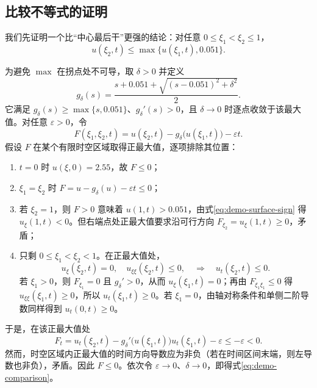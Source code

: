 \documentclass[UTF8,a4paper,fontset=fandol]{ctexart}
\numberwithin{equation}{section}
\newcommand{\ambmax}{0.051}
\begin{document}
\subsection{比较不等式的证明}

我们先证明一个比“中心最后干”更强的结论：对任意 $0\le\xi_1<\xi_2\le1$，
\begin{equation}
  u(\xi_2,t)\le \max\{u(\xi_1,t),\ambmax\}.
  \label{eq:demo-comparison}
\end{equation}

为避免 $\max$ 在拐点处不可导，取 $\delta>0$ 并定义
\begin{equation}
  g_\delta(s)=\frac{s+\ambmax+\sqrt{(s-\ambmax)^2+\delta^2}}{2}.
  \label{eq:demo-smooth-max}
\end{equation}
它满足 $g_\delta(s)\ge\max\{s,\ambmax\}$、$g_\delta'(s)>0$，且 $\delta\to0$ 时逐点收敛于该最大值。对任意 $\varepsilon>0$，令
\begin{equation}
  F(\xi_1,\xi_2,t)=u(\xi_2,t)-g_\delta\bigl(u(\xi_1,t)\bigr)-\varepsilon t.
  \label{eq:demo-F}
\end{equation}
假设 $F$ 在某个有限时空区域取得正最大值，逐项排除其位置：

\begin{enumerate}
  \item $t=0$ 时 $u(\xi,0)=2.55$，故 $F\le0$；
  \item $\xi_1=\xi_2$ 时 $F=u-g_\delta(u)-\varepsilon t\le0$；
  \item 若 $\xi_2=1$，则 $F>0$ 意味着 $u(1,t)>\ambmax$，由式\eqref{eq:demo-surface-sign} 得 $u_\xi(1,t)<0$。但右端点处正最大值要求沿可行方向 $F_{\xi_2}=u_\xi(1,t)\ge0$，矛盾；
  \item 只剩 $0\le\xi_1<\xi_2<1$。在正最大值处，
  \begin{equation*}
    u_\xi(\xi_2,t)=0,\quad u_{\xi\xi}(\xi_2,t)\le0,
    \quad\Longrightarrow\quad u_t(\xi_2,t)\le0.
  \end{equation*}
  若 $\xi_1>0$，则 $F_{\xi_1}=0$ 且 $g_\delta'>0$，从而 $u_\xi(\xi_1,t)=0$；再由 $F_{\xi_1\xi_1}\le0$ 得 $u_{\xi\xi}(\xi_1,t)\ge0$，所以 $u_t(\xi_1,t)\ge0$。若 $\xi_1=0$，由轴对称条件和单侧二阶导数同样得到 $u_t(0,t)\ge0$。
\end{enumerate}

于是，在该正最大值处
\begin{equation}
  F_t=u_t(\xi_2,t)-g_\delta'\bigl(u(\xi_1,t)\bigr)u_t(\xi_1,t)-\varepsilon
  \le-\varepsilon<0.
  \label{eq:demo-Ft}
\end{equation}
然而，时空区域内正最大值的时间方向导数应为非负（若在时间区间末端，则左导数也非负），矛盾。因此 $F\le0$。依次令 $\varepsilon\to0$、$\delta\to0$，即得式\eqref{eq:demo-comparison}。
\end{document}
